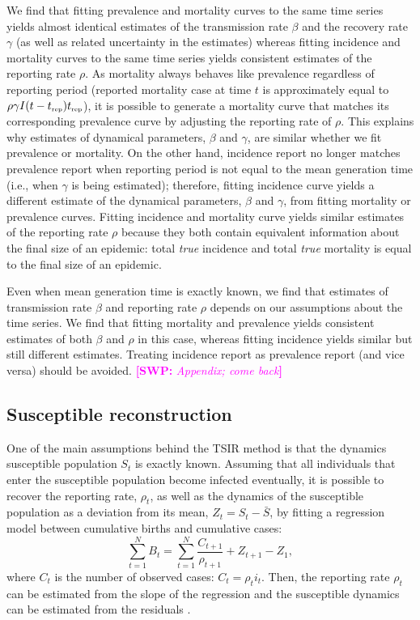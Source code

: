 \documentclass{article}
\newcommand{\comment}[3]{\textcolor{#1}{\textbf{[#2: }\textsl{#3}\textbf{]}}}
\newcommand{\swp}[1]{\comment{magenta}{SWP}{#1}}
\newcommand{\tsub}[2]{#1_{{\textrm{\tiny #2}}}}
\begin{document}
We find that fitting prevalence and mortality curves to the same time series yields almost identical estimates of the transmission rate $\beta$ and the recovery rate $\gamma$ (as well as related uncertainty in the estimates) whereas fitting incidence and mortality curves to the same time series yields consistent estimates of the reporting rate $\rho$.
As mortality always behaves like prevalence regardless of reporting period (reported mortality case at time $t$ is approximately equal to $\rho \gamma I(t-\tsub{t}{rep}) \tsub{t}{rep}$),
it is possible to generate a mortality curve that matches its corresponding prevalence curve by adjusting the reporting rate of $\rho$.
This explains why estimates of dynamical parameters, $\beta$ and $\gamma$, are similar whether we fit prevalence or mortality.
On the other hand, incidence report no longer matches prevalence report when reporting period is not equal to the mean generation time (i.e., when $\gamma$ is being estimated); therefore, fitting incidence curve yields a different estimate of the dynamical parameters, $\beta$ and $\gamma$, from fitting mortality or prevalence curves.
Fitting incidence and mortality curve yields similar estimates of the reporting rate $\rho$ because they both contain equivalent information about the final size of an epidemic: total \emph{true} incidence and total \emph{true} mortality is equal to the final size of an epidemic.

Even when mean generation time is exactly known, we find that estimates of transmission rate $\beta$ and reporting rate $\rho$ depends on our assumptions about the time series.
We find that fitting mortality and prevalence yields consistent estimates of both $\beta$ and $\rho$ in this case, whereas fitting incidence yields similar but still different estimates.
Treating incidence report as prevalence report (and vice versa) should be avoided.
\swp{Appendix; come back}

\subsection{Susceptible reconstruction}

One of the main assumptions behind the TSIR method is that the dynamics susceptible population $S_t$ is exactly known.
Assuming that all individuals that enter the susceptible population become infected eventually, it is possible to recover the reporting rate, $\rho_t$, as well as the dynamics of the susceptible population as a deviation from its mean, $Z_t = S_t - \bar{S}$, by fitting a regression model between cumulative births and cumulative cases: 
\begin{equation}
\sum_{t=1}^N B_t = \sum_{t=1}^N \frac{C_{t+1}}{\rho_{t+1}} + Z_{t+1} - Z_1,
\end{equation}
where $C_t$ is the number of observed cases: $C_t = \rho_t i_t$.
Then, the reporting rate $\rho_t$ can be estimated from the slope of the regression and the susceptible dynamics can be estimated from the residuals \citep{finkenstadt2000time}. 
\end{document}
